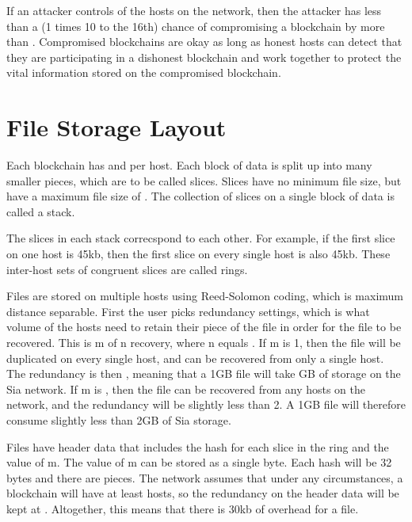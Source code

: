 \documentclass[twocolumn]{article}
\begin{document}
If an attacker controls \fortynine \space of the hosts on the network, then the attacker has less than a (1 times 10 to the 16th) chance of compromising a blockchain by more than \maxcorruption.
Compromised blockchains are okay as long as \inversemaxcorruption \space honest hosts can detect that they are participating in a dishonest blockchain and work together to protect the vital information stored on the compromised blockchain.

\section{File Storage Layout}

Each blockchain has \numhosts \space and \storageperhost \space per host.
Each \storageperhost \space block of data is split up into many smaller pieces, which are to be called slices.
Slices have no minimum file size, but have a maximum file size of \maxslicesize.
The collection of slices on a single block of data is called a stack.

The slices in each stack correcspond to each other.
For example, if the first slice on one host is 45kb, then the first slice on every single host is also 45kb.
These inter-host sets of congruent slices are called rings.

Files are stored on multiple hosts using Reed-Solomon coding, which is maximum distance separable.
First the user picks redundancy settings, which is what volume of the hosts need to retain their piece of the file in order for the file to be recovered.
This is m of n recovery, where n equals \numhosts.
If m is 1, then the file will be duplicated on every single host, and can be recovered from only a single host.
The redundancy is then \numhosts \space, meaning that a 1GB file will take \numhosts GB of storage on the Sia network.
If m is \fiftyone, then the file can be recovered from any \fiftyone \space hosts on the network, and the redundancy will be slightly less than 2.
A 1GB file will therefore consume slightly less than 2GB of Sia storage.

Files have header data that includes the hash for each slice in the ring and the value of m.
The value of m can be stored as a single byte.
Each hash will be 32 bytes and there are \numhosts pieces.
The network assumes that under any circumstances, a blockchain will have at least \inversemaxcorruption hosts, so the redundancy on the header data will be kept at \maxredundancy.
Altogether, this means that there is 30kb of overhead for a file.
\end{document}
